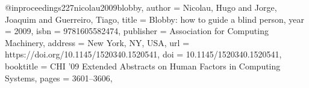 @inproceedings{227nicolau2009blobby,
author = {Nicolau, Hugo and Jorge, Joaquim and Guerreiro, Tiago},
title = {Blobby: how to guide a blind person},
year = {2009},
isbn = {9781605582474},
publisher = {Association for Computing Machinery},
address = {New York, NY, USA},
url = {https://doi.org/10.1145/1520340.1520541},
doi = {10.1145/1520340.1520541},
booktitle = {CHI '09 Extended Abstracts on Human Factors in Computing Systems},
pages = {3601–3606},
}